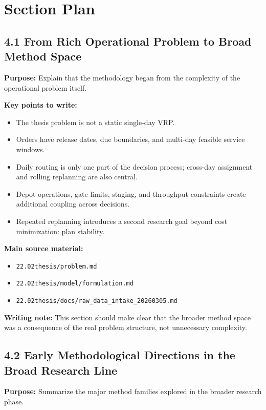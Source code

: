 \section{Section Plan}

\subsection*{4.1 From Rich Operational Problem to Broad Method Space}
\textbf{Purpose:} Explain that the methodology began from the complexity of the operational problem itself.

\textbf{Key points to write:}
\begin{itemize}
    \item The thesis problem is not a static single-day VRP.
    \item Orders have release dates, due boundaries, and multi-day feasible service windows.
    \item Daily routing is only one part of the decision process; cross-day assignment and rolling replanning are also central.
    \item Depot operations, gate limits, staging, and throughput constraints create additional coupling across decisions.
    \item Repeated replanning introduces a second research goal beyond cost minimization: plan stability.
\end{itemize}

\textbf{Main source material:}
\begin{itemize}
    \item \texttt{22.02thesis/problem.md}
    \item \texttt{22.02thesis/model/formulation.md}
    \item \texttt{22.02thesis/docs/raw\_data\_intake\_20260305.md}
\end{itemize}

\textbf{Writing note:} This section should make clear that the broader method space was a consequence of the real problem structure, not unnecessary complexity.

\subsection*{4.2 Early Methodological Directions in the Broad Research Line}
\textbf{Purpose:} Summarize the major method families explored in the broader research phase.

